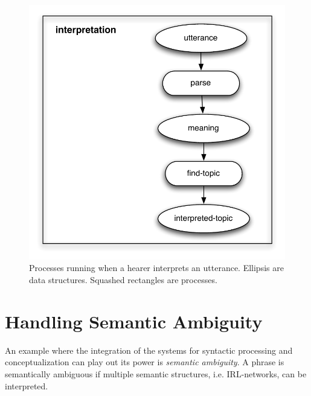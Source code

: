 \begin{figure}
\begin{center}
\includegraphics[width=0.7\columnwidth]{figs/interpretation}
\caption[Processes running when a hearer interprets an utterance]{
Processes running when a hearer interprets an utterance. Ellipsis are
data structures. Squashed rectangles are processes.}
\label{f:interpretation}
\end{center}
\end{figure}

\section{Handling Semantic Ambiguity}
\label{s:semantic-ambiguity}
An example where the integration of the systems for syntactic processing
and conceptualization can play out its power is \emph{semantic ambiguity}.
A phrase is semantically ambiguous if multiple semantic structures, i.e. IRL-networks,
can be interpreted. 

